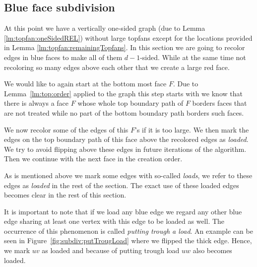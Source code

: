 
\subsection{Blue face subdivision}
\thispagestyle{plain}
\label{ss:subdiv}
  At this point we have a vertically one-sided graph (due to Lemma \ref{lm:topfan:oneSidedREL}) without large topfans except for the locations provided in Lemma \ref{lm:topfan:remainingTopfans}.
  In this section we are going to recolor edges in blue faces to make all of them $d-1$-sided.
  While at the same time not recoloring so many edges above each other that we create a large red face.

  We would like to again start at the bottom most face $F$. Due to Lemma~\ref{lm:top:order} applied to the graph this step starts with we know that there is always a face $F$  whose whole top boundary path of $F$ borders faces that are not treated while no part of the bottom boundary path borders such faces.

  We now recolor some of the edges of this $F$'s if it is too large.
  We then mark the edges on the top boundary path of this face above the recolored edges as \emph{loaded}.
  We try to avoid flipping above these edges in future iterations of the algorithm.
  Then we continue with the next face in the creation order.

  As is mentioned above we mark some edges with so-called \emph{loads}, we refer to these edges as \emph{loaded} in the rest of the section.
  The exact use of these loaded edges becomes clear in the rest of this section.

  It is important to note that if we load any blue edge we regard any other blue edge sharing at least one vertex with this edge to be loaded as well.
  The occurrence of this phenomenon is called \emph{putting trough a load}.
  An example can be seen in Figure~\ref{fig:subdiv:putTrougLoad} where we flipped the thick edge.
  Hence, we mark $uv$ as loaded and because of putting trough load $uw$ also becomes loaded.

